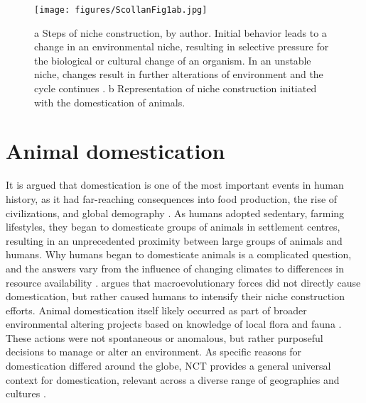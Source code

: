 	\begin{figure}[!htb]
		\texttt{[image: figures/ScollanFig1ab.jpg]}
		\caption{a Steps of niche construction, by author. Initial behavior leads to a change in an environmental niche, resulting in selective pressure for the biological or cultural change of an organism. 
In an unstable niche, changes result in further alterations of environment and the cycle continues \parencite{Rowley-Conwy_2011}. 
\newline b Representation of niche construction initiated with the domestication of animals.}
		\label{fig:ScollanFig1ab} %
	\end{figure}

\section{Animal domestication}
It is argued that domestication is one of the most important events in human history, 
as it had far-reaching consequences into food production, 
the rise of civilizations, and global demography \parencite[700]{Diamond_2002}. 
As humans adopted sedentary, farming lifestyles, they began to domesticate groups of animals in settlement centres, resulting in an unprecedented proximity between large groups of animals and humans. 
Why humans began to domesticate animals is a complicated question, and the answers vary from the influence of changing climates to differences in resource availability 
\parencite[111--115]{Zeder_2006a}. 
\textcite[189--190]{Smith_2007} argues that macroevolutionary forces did not directly cause domestication, but rather caused humans to intensify their niche construction efforts. Animal domestication itself likely occurred as part of broader environmental altering projects based on knowledge of local flora and fauna 
\parencite[111--115]{Zeder_2006a}. 
These actions were not spontaneous or anomalous, but rather purposeful decisions to manage or alter an environment. 
As specific reasons for domestication differed around the globe,
 NCT provides a general universal context for domestication, 
relevant across a diverse range of geographies and cultures \parencite[1993--195]{Smith_2007}. 

